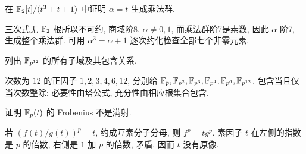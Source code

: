 \begin{example}在 $\mathbb F_2[t]/(t^3+t+1)$ 中证明 $\alpha=\bar t$ 生成乘法群.\end{example}
\begin{solution}
三次式无 $\mathbb F_2$ 根所以不可约, 商域阶8. $\alpha\ne0,1$, 而乘法群阶7是素数, 因此 $\alpha$ 阶7, 生成整个乘法群. 可用 $\alpha^3=\alpha+1$ 逐次约化检查全部七个非零元素.
\end{solution}
\begin{exercise}列出 $\mathbb F_{p^{12}}$ 的所有子域及其包含关系.\end{exercise}
\begin{solution}
次数为 $12$ 的正因子 $1,2,3,4,6,12$, 分别给 $\mathbb F_p,\mathbb F_{p^2},\mathbb F_{p^3},\mathbb F_{p^4},\mathbb F_{p^6},\mathbb F_{p^{12}}$. 包含当且仅当次数整除: 必要性由塔公式, 充分性由相应根集合包含.
\end{solution}
\begin{exercise}证明 $\mathbb F_p(t)$ 的 Frobenius 不是满射.\end{exercise}
\begin{solution}
若 $(f(t)/g(t))^p=t$, 约成互素分子分母, 则 $f^p=tg^p$. 素因子 $t$ 在左侧的指数是 $p$ 的倍数, 右侧是 $1$ 加 $p$ 的倍数, 矛盾. 因而 $t$ 没有原像.
\end{solution}
